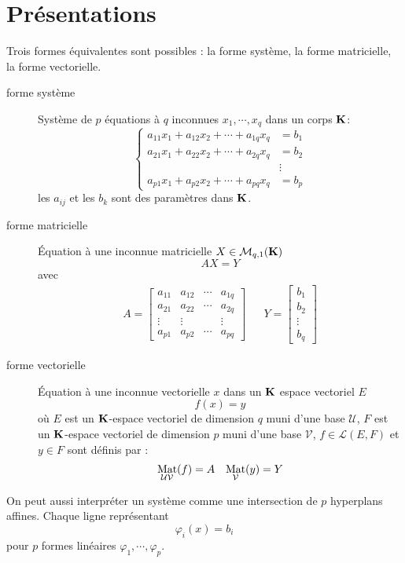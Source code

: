 

\section{Présentations}
Trois formes équivalentes sont possibles : la forme système, la forme matricielle, la forme vectorielle.
\begin{description}
 \item[forme système]
Système de $p$ équations à $q$ inconnues $x_1,\cdots, x_q$ dans un corps $\mathbf{K}$:
\begin{displaymath}
 \left\lbrace
\begin{aligned}
 a_{11}x_1+a_{12}x_2+\cdots +a_{1q}x_q &= b_1 \\
 a_{21}x_1+a_{22}x_2+\cdots +a_{2q}x_q &= b_2 \\
   &\vdots \\
a_{p1}x_1+a_{p2}x_2+\cdots +a_{pq}x_q &= b_p 
\end{aligned}
\right. 
\end{displaymath}
les $a_{ij}$ et les $b_k$ sont des paramètres dans $\mathbf{K}$.
\item [forme matricielle]
\'Equation à une inconnue matricielle $X\in \mathcal M_{q,1}(\mathbf{K})$
\begin{displaymath}
 AX = Y
\end{displaymath}
avec
\begin{align*}
 A=\begin{bmatrix}
a_{11} & a_{12} & \cdots & a_{1q} \\
a_{21} & a_{22} & \cdots & a_{2q} \\
 \vdots  & \vdots &        & \vdots \\
a_{p1}& a_{p2} & \cdots & a_{pq}
   \end{bmatrix}
& &
Y=\begin{bmatrix}
   b_1\\
   b_2\\
\vdots \\
b_q
  \end{bmatrix}
\end{align*}
\item[forme vectorielle]
\'Equation à une inconnue vectorielle $x$ dans un $\mathbf{K}$ espace vectoriel $E$
\begin{displaymath}
 f(x)=y
\end{displaymath}
où $E$ est un $\mathbf{K}$-espace vectoriel de dimension $q$ muni d'une base $\mathcal U$, $F$ est un $\mathbf{K}$-espace vectoriel de dimension $p$ muni d'une base $\mathcal V$, $f\in \mathcal L(E,F)$ et $y\in F$ sont définis par :
\begin{align*}
 \mathop{\mathrm{Mat}}_{\mathcal U \mathcal V}(f) = A & & \mathop{\mathrm{Mat}}_{\mathcal V}(y) = Y
\end{align*}
\end{description}
\begin{rem}
 On peut aussi interpréter un système comme une intersection de $p$ hyperplans affines. Chaque ligne représentant
\begin{displaymath}
 \varphi_i(x)=b_i
\end{displaymath}
pour $p$ formes linéaires $\varphi_1,\cdots,\varphi_p$.
\end{rem}

